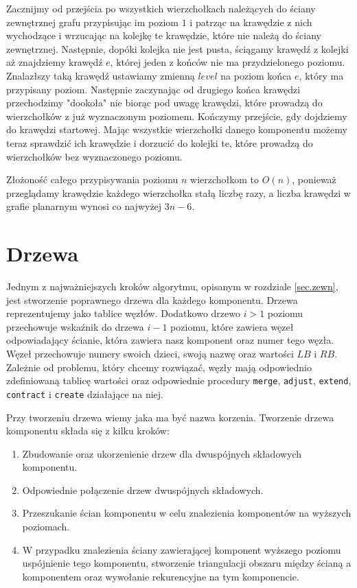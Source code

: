 \documentclass[twoside,a4paper,12pt]{report} %
\theoremstyle{break}
\begin{document}
Zacznijmy od przejścia po wszystkich wierzchołkach należących do ściany zewnętrznej grafu przypisując im poziom $1$ i patrząc na krawędzie z nich wychodzące i wrzucając na kolejkę te krawędzie, które nie należą do ściany zewnętrznej. Następnie, dopóki kolejka nie jest pusta, ściągamy krawędź z kolejki aż znajdziemy krawędź $e$, której jeden z końców nie ma przydzielonego poziomu. Znalazłszy taką krawędź ustawiamy zmienną $level$ na poziom końca $e$, który ma przypisany poziom. Następnie zaczynając od drugiego końca krawędzi przechodzimy "dookoła" nie biorąc pod uwagę krawędzi, które prowadzą do wierzchołków z już wyznaczonym poziomem. Kończymy przejście, gdy dojdziemy do krawędzi startowej. Mając wszystkie wierzchołki danego komponentu możemy teraz sprawdzić ich krawędzie i dorzucić do kolejki te, które prowadzą do wierzchołków bez wyznaczonego poziomu.

Złożoność całego przypisywania poziomu $n$ wierzchołkom to $O(n)$, ponieważ przeglądamy krawędzie każdego wierzchołka stałą liczbę razy, a liczba krawędzi w grafie planarnym wynosi co najwyżej $3n - 6$.

\section{Drzewa} \label{sekcja_4.2}
Jednym z najważniejszych kroków algorytmu, opisanym w rozdziale \ref{sec.zewn}, jest stworzenie poprawnego drzewa dla każdego komponentu. Drzewa reprezentujemy jako tablice węzłów. Dodatkowo drzewo $i>1$ poziomu przechowuje wskaźnik do drzewa $i-1$ poziomu, które zawiera węzeł odpowiadający ścianie, która zawiera nasz komponent oraz numer tego węzła. Węzeł przechowuje numery swoich dzieci, swoją nazwę oraz wartości $LB$ i $RB$. Zależnie od problemu, który chcemy rozwiązać, węzły mają odpowiednio zdefiniowaną tablicę wartości oraz odpowiednie procedury \texttt{merge}, \texttt{adjust}, \texttt{extend}, \texttt{contract} i \texttt{create} działające na niej.

Przy tworzeniu drzewa wiemy jaka ma być nazwa korzenia. Tworzenie drzewa komponentu składa się z kilku kroków:
\begin{enumerate}
    \item Zbudowanie oraz ukorzenienie drzew dla dwuspójnych składowych komponentu.
    \item Odpowiednie połączenie drzew dwuspójnych składowych.
    \item Przeszukanie ścian komponentu w celu znalezienia komponentów na wyższych poziomach.
    \item W przypadku znalezienia ściany zawierającej komponent wyższego poziomu uspójnienie tego komponentu, stworzenie triangulacji obszaru między ścianą a komponentem oraz wywołanie rekurencyjne na tym komponencie.
\end{enumerate}
\end{document}
